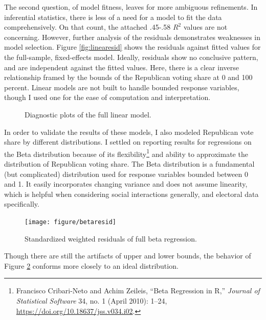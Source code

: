 \documentclass[12pt,oneside]{psthesis}
\begin{document}
The second question, of model fitness, leaves for more ambiguous refinements.
In inferential statistics, there is less of a need for a model to fit the data comprehensively.
On that count, the attached .45-.58 \(R^{2}\) values are not concerning.
However, further analysis of the residuals demonstrates weaknesses in model selection.
Figure \ref{fig:linearesid} shows the residuals against fitted values for the full-sample, fixed-effects model.
Ideally, residuals show no conclusive pattern, and are independent against the fitted values.
Here, there is a clear inverse relationship framed by the bounds of the Republican voting share at 0 and 100 percent.
Linear models are not built to handle bounded response variables, though I used one for the ease of computation and interpretation.
\begin{figure}

{\centering {}

}

\caption{Diagnostic plots of the full linear model.}\label{fig:linear}
\end{figure}
In order to validate the results of these models, I also modeled Republican vote share by different distributions.
I settled on reporting results for regressions on the Beta distribution because of its flexibility\footnote{Francisco Cribari-Neto and Achim Zeileis, ``Beta Regression in R,'' \emph{Journal of Statistical Software} 34, no. 1 (April 2010): 1--24, \url{https://doi.org/10.18637/jss.v034.i02}.} and ability to approximate the distribution of Republican voting share.
The Beta distribution is a fundamental (but complicated) distribution used for response variables bounded between 0 and 1.
It easily incorporates changing variance and does not assume linearity, which is helpful when considering social interactions generally, and electoral data specifically.
\begin{figure}

{\centering \texttt{[image: figure/betaresid]} 

}

\caption{Standardized weighted residuals of full beta regression.}\label{fig:betaresid}
\end{figure}
Though there are still the artifacts of upper and lower bounds, the behavior of Figure \ref{fig:betaresid} conforms more closely to an ideal distribution.
\end{document}
